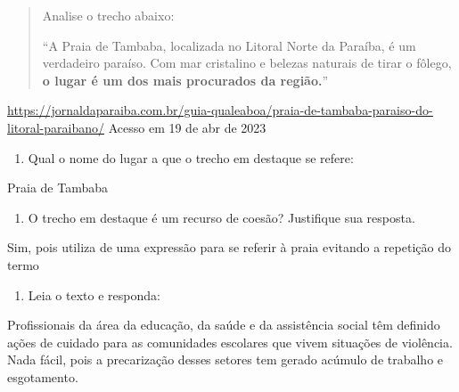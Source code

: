 {{


\begin{quote}
Analise o trecho abaixo:

``A Praia de Tambaba, localizada no Litoral Norte da Paraíba, é um
verdadeiro paraíso. Com mar cristalino e belezas naturais de tirar o
fôlego, \textbf{o lugar é um dos mais procurados da região.}''
\end{quote}

\href{https://jornaldaparaiba.com.br/guia-qualeaboa/praia-de-tambaba-paraiso-do-litoral-paraibano/}{\uline{https://jornaldaparaiba.com.br/guia-qualeaboa/praia-de-tambaba-paraiso-do-litoral-paraibano/}}
Acesso em 19 de abr de 2023

\begin{enumerate}
\def\labelenumi{\arabic{enumi})}
\tightlist
\item
  Qual o nome do lugar a que o trecho em destaque se refere:
\end{enumerate}

Praia de Tambaba

\begin{enumerate}
\def\labelenumi{\arabic{enumi})}
\setcounter{enumi}{1}
\tightlist
\item
  O trecho em destaque é um recurso de coesão? Justifique sua resposta.
\end{enumerate}

Sim, pois utiliza de uma expressão para se referir à praia evitando a
repetição do termo

\begin{enumerate}
\def\labelenumi{\arabic{enumi})}
\setcounter{enumi}{2}
\tightlist
\item
  Leia o texto e responda:
\end{enumerate}

Profissionais da área da educação, da saúde e da assistência social têm
definido ações de cuidado para as comunidades escolares que vivem
situações de violência. Nada fácil, pois a precarização desses setores
tem gerado acúmulo de trabalho e esgotamento.

}}
